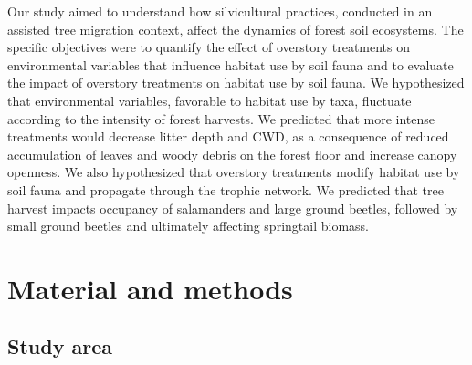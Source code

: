 Our study aimed to understand how silvicultural practices, conducted in an assisted tree migration context, affect the dynamics of forest soil ecosystems. 
The specific objectives were to quantify the effect of overstory treatments on environmental variables that influence habitat use by soil fauna
and to evaluate the impact of overstory treatments on habitat use by soil fauna.
We hypothesized that environmental variables, favorable to habitat use by taxa, fluctuate according to the intensity of forest harvests. 
We predicted that more intense treatments would decrease litter depth and CWD, as a consequence of reduced accumulation of leaves and woody debris on the forest floor and increase canopy openness. 
We also hypothesized that overstory treatments modify habitat use by soil fauna and propagate through the trophic network. 
We predicted that tree harvest impacts occupancy of salamanders and large ground beetles, 
followed by small ground beetles and ultimately affecting springtail biomass. 


\section*{Material and methods}
\label{sec:matmet1}

\subsection*{Study area}
\label{subsec:area}

